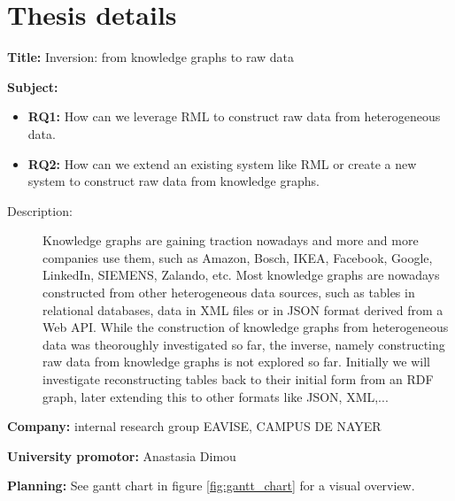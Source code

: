 
\chapter{Thesis details}

\textbf{Title: } Inversion: from knowledge graphs to raw data

\textbf{Subject: } 
\begin{itemize}
	\item \textbf{RQ1: } How can we leverage RML to construct raw data from heterogeneous data.
	\item \textbf{RQ2: } How can we extend an existing system like RML or create a new system to construct raw data from knowledge graphs.
\end{itemize}

\begin{description}
	\item[Description:] Knowledge graphs are gaining traction nowadays and more and more companies use them, such as Amazon, Bosch, IKEA, Facebook, Google, LinkedIn, SIEMENS, Zalando, etc. Most knowledge graphs are nowadays constructed from other heterogeneous data sources, such as tables in relational databases, data in XML files or in JSON format derived from a Web API. While the construction of knowledge graphs from heterogeneous data was theoroughly investigated so far, the inverse, namely constructing raw data from knowledge graphs is not explored so far. \newline Initially we will investigate reconstructing tables back to their initial form from an RDF graph, later extending this to other formats like JSON, XML,...
\end{description}

\textbf{Company: } internal research group EAVISE, CAMPUS DE NAYER

\textbf{University promotor: } Anastasia Dimou

\textbf{Planning: } See gantt chart in figure \ref{fig:gantt_chart} for a visual overview.

